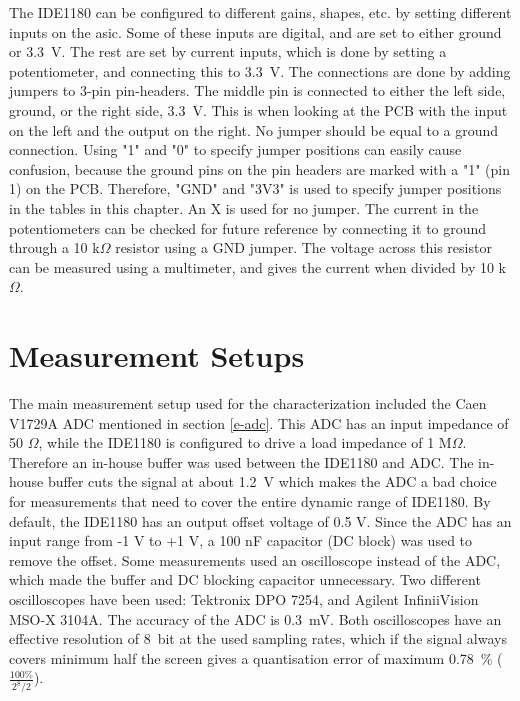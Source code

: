\documentclass[../main/thesis.tex]{subfiles}
\begin{document}
The IDE1180 can be configured to different gains, shapes, etc. by setting different inputs on the \gls{asic}. Some of these inputs are digital, and are set to either ground or 3.3~V. The rest are set by current inputs, which is done by setting a potentiometer, and connecting this to 3.3~V. The connections are done by adding jumpers to 3-pin pin-headers. The middle pin is connected to either the left side, ground, or the right side, 3.3~V. This is when looking at the \gls{PCB} with the input on the left and the output on the right. No jumper should be equal to a ground connection. Using "1" and "0" to specify jumper positions can easily cause confusion, because the ground pins on the pin headers are marked with a "1" (pin 1) on the \gls{PCB}. Therefore, "GND" and "3V3" is used to specify jumper positions in the tables in this chapter.  An X is used for no jumper. The current in the potentiometers can be checked for future reference by connecting it to ground through a 10 k$\Omega$ resistor using a GND jumper. The voltage across this resistor can be measured using a multimeter, and gives the current when divided by 10 k$\Omega$. 

\section{Measurement Setups}
\label{ide-setup}

The main measurement setup used for the characterization included the Caen V1729A \gls{ADC} mentioned in section \ref{e-adc}. This \gls{ADC} has an input impedance of 50 $\Omega$, while the IDE1180 is configured to drive a load impedance of 1 M$\Omega$. Therefore an in-house buffer was used between the IDE1180 and ADC. The in-house buffer cuts the signal at about 1.2~V which makes the \gls{ADC} a bad choice for measurements that need to cover the entire dynamic range of IDE1180. By default, the IDE1180 has an output offset voltage of 0.5 V. Since the ADC has an input range from -1 V to +1 V, a 100 nF capacitor (DC block) was used to remove the offset. Some measurements used an oscilloscope instead of the ADC, which made the buffer and DC blocking capacitor unnecessary. Two different oscilloscopes have been used: Tektronix DPO 7254, and Agilent InfiniiVision MSO-X 3104A. The accuracy of the ADC is 0.3~mV. Both oscilloscopes have an effective resolution of 8~bit at the used sampling rates, which if the signal always covers minimum half the screen gives a quantisation error of maximum 0.78~\% ($\frac{100\%}{2^8/2}$). %
\end{document}
